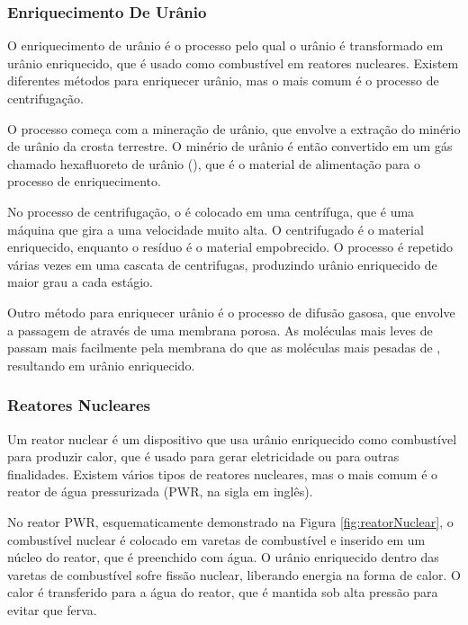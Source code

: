 \documentclass[11pt,a4paper]{article}
\begin{document}
            \subsubsection{Enriquecimento De Urânio}

                O enriquecimento de urânio é o processo pelo qual o urânio é transformado em urânio enriquecido, que é usado como combustível em reatores nucleares. Existem diferentes métodos para enriquecer urânio, mas o mais comum é o processo de centrifugação.

                O processo começa com a mineração de urânio, que envolve a extração do minério de urânio da crosta terrestre. O minério de urânio é então convertido em um gás chamado hexafluoreto de urânio (), que é o material de alimentação para o processo de enriquecimento.
                
                No processo de centrifugação, o  é colocado em uma centrífuga, que é uma máquina que gira a uma velocidade muito alta. O centrifugado é o material enriquecido, enquanto o resíduo é o material empobrecido. O processo é repetido várias vezes em uma cascata de centrifugas, produzindo urânio enriquecido de maior grau a cada estágio.
                
                Outro método para enriquecer urânio é o processo de difusão gasosa, que envolve a passagem de  através de uma membrana porosa. As moléculas mais leves de  passam mais facilmente pela membrana do que as moléculas mais pesadas de , resultando em urânio enriquecido.

            \subsubsection{Reatores Nucleares}

                Um reator nuclear é um dispositivo que usa urânio enriquecido como combustível para produzir calor, que é usado para gerar eletricidade ou para outras finalidades. Existem vários tipos de reatores nucleares, mas o mais comum é o reator de água pressurizada (PWR, na sigla em inglês).

                No reator PWR, esquematicamente demonstrado na Figura \ref{fig:reatorNuclear}, o combustível nuclear é colocado em varetas de combustível e inserido em um núcleo do reator, que é preenchido com água. O urânio enriquecido dentro das varetas de combustível sofre fissão nuclear, liberando energia na forma de calor. O calor é transferido para a água do reator, que é mantida sob alta pressão para evitar que ferva.
                
\end{document}
